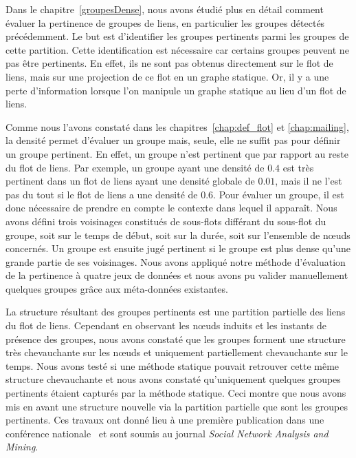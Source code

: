 \bigskip

Dans le chapitre~\ref{groupesDense}, nous avons étudié plus en détail comment évaluer la pertinence de groupes de liens, en particulier les groupes détectés précédemment.
Le but est d'identifier les groupes pertinents parmi les groupes de cette partition.
Cette identification est nécessaire car certains groupes peuvent ne pas être pertinents.
En effet, ils ne sont pas obtenus directement sur le flot de liens, mais sur une projection de ce flot en un graphe statique.
Or, il y a une perte d'information lorsque l'on manipule un graphe statique au lieu d'un flot de liens.

Comme nous l'avons constaté dans les chapitres~\ref{chap:def_flot} et \ref{chap:mailing}, la densité permet d'évaluer un groupe mais, seule, elle ne suffit pas pour définir un groupe pertinent.
En effet, un groupe n'est pertinent que par rapport au reste du flot de liens.
Par exemple, un groupe ayant une densité de $0.4$ est très pertinent dans un flot de liens ayant une densité globale de $0.01$, mais il ne l'est pas du tout si le flot de liens a une densité de $0.6$.
Pour évaluer un groupe, il est donc nécessaire de prendre en compte le contexte dans lequel il apparaît.
Nous avons défini trois voisinages constitués de sous-flots différant du sous-flot du groupe, soit sur le temps de début, soit sur la durée, soit sur l'ensemble de n\oe{}uds concernés.
Un groupe est ensuite jugé pertinent si le groupe est plus dense qu'une grande partie de ses voisinages.
Nous avons appliqué notre méthode d'évaluation de la pertinence à quatre jeux de données et nous avons pu valider manuellement quelques groupes grâce aux méta-données existantes.

La structure résultant des groupes pertinents est une partition partielle des liens du flot de liens.
Cependant en observant les n\oe{}uds induits et les instants de présence des groupes, nous avons constaté que les groupes forment une structure très chevauchante sur les n\oe{}uds et uniquement partiellement chevauchante sur le temps.
Nous avons testé si une méthode statique pouvait retrouver cette même structure chevauchante et nous avons constaté qu'uniquement quelques groupes pertinents étaient capturés par la méthode statique.
Ceci montre que nous avons mis en avant une structure nouvelle via la partition partielle que sont les groupes pertinents.
Ces travaux ont donné lieu à une première publication dans une conférence nationale~\cite{gaumont:hal-01305118} et sont soumis au journal \emph{Social Network Analysis and Mining}.


